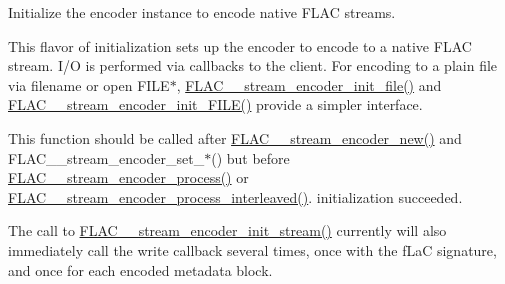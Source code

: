 Initialize the encoder instance to encode native F\+L\+AC streams.

This flavor of initialization sets up the encoder to encode to a native F\+L\+AC stream. I/O is performed via callbacks to the client. For encoding to a plain file via filename or open {\ttfamily F\+I\+L\+E$\ast$}, \hyperlink{group__flac__stream__encoder_ga693bb5ed30d912822e0e6c7c0404428c}{F\+L\+A\+C\+\_\+\+\_\+stream\+\_\+encoder\+\_\+init\+\_\+file()} and \hyperlink{group__flac__stream__encoder_ga78653fea5d9bc490fff34e3ef86de944}{F\+L\+A\+C\+\_\+\+\_\+stream\+\_\+encoder\+\_\+init\+\_\+\+F\+I\+L\+E()} provide a simpler interface.

This function should be called after \hyperlink{group__flac__stream__encoder_ga35f3d94452bcf0a90a31c7d770b200bc}{F\+L\+A\+C\+\_\+\+\_\+stream\+\_\+encoder\+\_\+new()} and F\+L\+A\+C\+\_\+\+\_\+stream\+\_\+encoder\+\_\+set\+\_\+$\ast$() but before \hyperlink{group__flac__stream__encoder_gae187ec4f6cab3ca109637996ee23272d}{F\+L\+A\+C\+\_\+\+\_\+stream\+\_\+encoder\+\_\+process()} or \hyperlink{group__flac__stream__encoder_ga67c2ff5b23b945180797de420b1f27c0}{F\+L\+A\+C\+\_\+\+\_\+stream\+\_\+encoder\+\_\+process\+\_\+interleaved()}. initialization succeeded.

The call to \hyperlink{group__flac__stream__encoder_ga85221c4ceb9f22dfd4983d8f07a9a35b}{F\+L\+A\+C\+\_\+\+\_\+stream\+\_\+encoder\+\_\+init\+\_\+stream()} currently will also immediately call the write callback several times, once with the {\ttfamily f\+LaC} signature, and once for each encoded metadata block.


